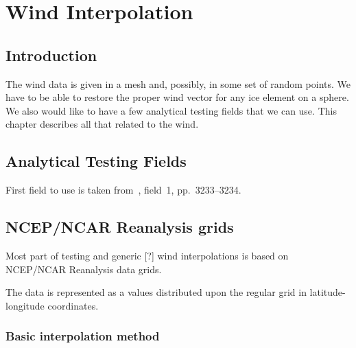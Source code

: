
\chapter{Wind Interpolation}


\section{Introduction}

The wind data is given in a mesh and, possibly, in some set of random
points. We have to be able to restore the proper wind vector for any
ice element on a sphere. We also would like to have a few analytical
testing fields that we can use. This chapter describes all that
related to the wind.


\section{Analytical Testing Fields}

First field to use is taken from~\cite{bib:fuselier2009stability},
field~1, pp.~3233--3234.


\section{NCEP/NCAR Reanalysis grids}

Most part of testing and generic [?] wind interpolations is based on NCEP/NCAR Reanalysis data grids. 

The data is represented as a values distributed upon the regular grid in latitude-longitude coordinates. 
  
\subsection{Basic interpolation method}

